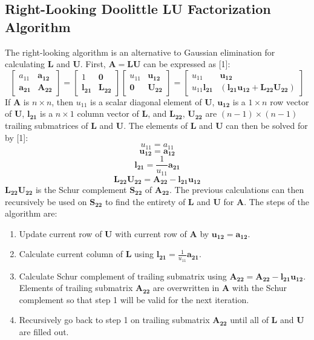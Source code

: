 \documentclass{article}
\begin{document}
\subsection{Right-Looking Doolittle LU Factorization Algorithm}
The right-looking algorithm is an alternative to Gaussian elimination for calculating $\mathbf{L}$ and $\mathbf{U}$. First, $\mathbf{A=LU}$ can be expressed as [1]:
$$\begin{bmatrix}
	a_{11} & \bm{a_{12}} \\
	\bm{a_{21}} & \bm{A_{22}}
\end{bmatrix} = 
\begin{bmatrix}
	1 & \bm{0} \\
	\bm{l_{21}} & \bm{L_{22}}
\end{bmatrix}
\begin{bmatrix}
	u_{11} & \bm{u_{12}} \\
	\bm{0} & \bm{U_{22}}
\end{bmatrix} = 
\begin{bmatrix}
	u_{11} & \bm{u_{12}} \\
	u_{11}\bm{l_{21}} & (\bm{l_{21}u_{12}+L_{22}U_{22}})
\end{bmatrix}$$
If $\mathbf{A}$ is $n\times n$, then $u_{11}$ is a scalar diagonal element of $\mathbf{U}$, $\bm{u_{12}}$ is a $1\times n$ row vector of $\mathbf{U}$, $\bm{l_{21}}$ is a $n\times 1$ column vector of $\mathbf{L}$, and $\bm{L_{22}}$, $\bm{U_{22}}$ are $(n-1)\times (n-1)$ trailing submatrices of $\mathbf{L}$ and $\mathbf{U}$. The elements of $\mathbf{L}$ and $\mathbf{U}$ can then be solved for by [1]:
$$u_{11}=a_{11}$$
$$\bm{u_{12}}=\bm{a_{12}}$$
$$\bm{l_{21}}=\frac{1}{u_{11}}\bm{a_{21}}$$
$$\bm{L_{22}U_{22}}=\bm{A_{22}}-\bm{l_{21}u_{12}}$$
$\bm{L_{22}U_{22}}$ is the Schur complement $\bm{S_{22}}$ of $\bm{A_{22}}$. The previous calculations can then recursively be used on $\bm{S_{22}}$ to find the entirety of $\mathbf{L}$ and $\mathbf{U}$ for $\mathbf{A}$. The steps of the algorithm are:
\begin{enumerate}
	\item Update current row of $\mathbf{U}$ with current row of $\mathbf{A}$ by $\bm{u_{12}}=\bm{a_{12}}$.
	\item Calculate current column of $\mathbf{L}$ using $\bm{l_{21}}=\frac{1}{u_{11}}\bm{a_{21}}$.
	\item Calculate Schur complement of trailing submatrix using $\bm{A_{22}}=\bm{A_{22}}-\bm{l_{21}u_{12}}$. Elements of trailing submatrix $\bm{A_{22}}$ are overwritten in $\mathbf{A}$ with the Schur complement so that step 1 will be valid for the next iteration.
	\item Recursively go back to step 1 on trailing submatrix $\bm{A_{22}}$ until all of $\mathbf{L}$ and $\mathbf{U}$ are filled out.
\end{enumerate}
\end{document}
